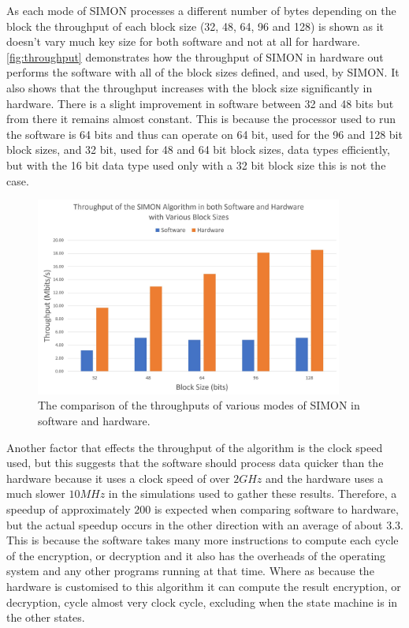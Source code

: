 \documentclass[12pt,twoside,a4paper]{report}
\begin{document}
	As each mode of SIMON processes a different number of bytes depending on the block the throughput of each block size (32, 48, 64, 96 and 128) is shown as it doesn't vary much key size for both software and not at all for hardware. \autoref{fig:throughput} demonstrates how the throughput of SIMON in hardware out performs the software with all of the block sizes defined, and used, by SIMON. It also shows that the throughput increases with the block size significantly in hardware. There is a slight improvement in software between 32 and 48 bits but from there it remains almost constant. This is because the processor used to run the software is 64 bits and thus can operate on 64 bit, used for the 96 and 128 bit block sizes, and 32 bit, used for 48 and 64 bit block sizes, data types efficiently, but with the 16 bit data type used only with a 32 bit block size this is not the case.
	
	\begin{figure}[H]
		\includegraphics[width=0.9\textwidth]{SIMON_throughput}
		\centering
		\caption{The comparison of the throughputs of various modes of SIMON in software and hardware.}
		\label{fig:throughput}
	\end{figure}
	
	Another factor that effects the throughput of the algorithm is the clock speed used, but this suggests that the software should process data quicker than the hardware because it uses a clock speed of over $2GHz$ and the hardware uses a much slower $10MHz$ in the simulations used to gather these results. Therefore, a speedup of approximately $200$ is expected when comparing software to hardware, but the actual speedup occurs in the other direction with an average of about $3.3$. This is because the software takes many more instructions to compute each cycle of the encryption, or decryption and it also has the overheads of the operating system and any other programs running at that time. Where as because the hardware is customised to this algorithm it can compute the result encryption, or decryption, cycle almost very clock cycle, excluding when the state machine is in the other states.
\end{document}
